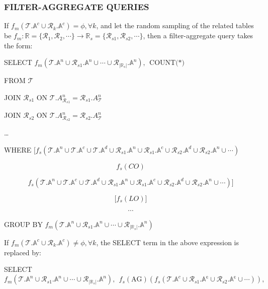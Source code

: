 \hypertarget{filter-aggregate-queries-1}{%
\subsubsection{FILTER-AGGREGATE
QUERIES}\label{filter-aggregate-queries-1}}

If
\(f_{m}(\mathcal{T}.\mathbb{A}^{c} \cup \mathcal{R}_{k}.\mathbb{A}^{c}) = \phi,\forall k\),
and let the random sampling of the related tables be
\(f_{m}:\mathbb{R} = \{\mathcal{R}_{1},\mathcal{R}_{2},\cdots\} \rightarrow \mathbb{R}_{s} = \{\mathcal{R}_{s1},\mathcal{R}_{s2},\cdots\}\),
then a filter-aggregate query takes the form:

SELECT
\(f_{m}\left( \mathcal{T}.\mathbb{A}^{n} \cup \mathcal{R}_{s1}.\mathbb{A}^{n} \cup \cdots \cup \mathcal{R}_{\left| \mathbb{R}_{s} \right|}.\mathbb{A}^{n} \right),\ \ \mathrm{COUNT(}\mathrm{*)}\)

FROM \(\mathcal{T}\)

JOIN \(\mathcal{R}_{s1}\) ON
\(\mathcal{T}.A_{\mathcal{R}_{s1}}^{n} = \mathcal{R}_{s1}.A_{\mathcal{T}}^{n}\)

JOIN \(\mathcal{R}_{s2}\) ON
\(\mathcal{T}.A_{\mathcal{R}_{s2}}^{n} = \mathcal{R}_{s2}.A_{\mathcal{T}}^{n}\)

\ldots{}

WHERE
\(\lbrack f_{s}(\mathcal{T}.\mathbb{A}^{n} \cup \mathcal{T}.\mathbb{A}^{c} \cup \mathcal{T}.\mathbb{A}^{d} \cup \mathcal{R}_{s1}.\mathbb{A}^{n} \cup \mathcal{R}_{s1}.\mathbb{A}^{c} \cup \mathcal{R}_{s2}.\mathbb{A}^{d} \cup \mathcal{R}_{s2}.\mathbb{A}^{n} \cup \cdots)\)

\[f_{s}(CO)\]

\[f_{s}(\mathcal{T}.\mathbb{A}^{n} \cup \mathcal{T}.\mathbb{A}^{c} \cup \mathcal{T}.\mathbb{A}^{d} \cup \mathcal{R}_{s1}.\mathbb{A}^{n} \cup \mathcal{R}_{s1}.\mathbb{A}^{c} \cup \mathcal{R}_{s2}.\mathbb{A}^{d} \cup \mathcal{R}_{s2}.\mathbb{A}^{n} \cup \cdots)\rbrack\]

\[\lbrack f_{s}(LO)\rbrack\]

\[\cdots\]

GROUP BY
\(f_{m}(\mathcal{T}.\mathbb{A}^{n} \cup \mathcal{R}_{s1}.\mathbb{A}^{n} \cup \cdots \cup \mathcal{R}_{|\mathbb{R}_{s}|}.\mathbb{A}^{n})\)

If
\(f_{m}(\mathcal{T}.\mathbb{A}^{c} \cup \mathcal{R}_{k}.\mathbb{A}^{c}) \neq \phi,\forall k\),
the SELECT term in the above expression is replaced by:

SELECT
\(f_{m}\left( \mathcal{T}.\mathbb{A}^{n} \cup \mathcal{R}_{s1}.\mathbb{A}^{n} \cup \cdots \cup \mathcal{R}_{\left| \mathbb{R}_{s} \right|}.\mathbb{A}^{n} \right),\ \ f_{s}\left( \text{AG} \right)\left( f_{s}\left( \mathcal{T}.\mathbb{A}^{c} \cup \mathcal{R}_{s1}.\mathbb{A}^{\mathbb{c}} \cup \mathcal{R}_{s2}.\mathbb{A}^{\mathbb{c}} \cup \cdots \right) \right),\)

